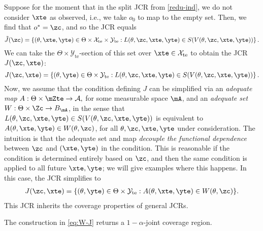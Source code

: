 \documentclass[english]{article}
\begin{document}
Suppose for the moment that in the split JCR from \eqref{redu-ind}, 
we do not consider $\xte$ as observed, i.e., 
we take $o_0$ to map to the empty set.
Then, we find that $o^* = \zc$, and so the JCR equals
$$\tilde J(\zc)= \left\{(\theta, \xte,\yte) 
\in\Theta\times\mathcal{X}_{\mathrm{te}} \times \mathcal{Y}_{\mathrm{te}}: 
L(\theta,\zc,\xte,\yte) \in S(V(\theta,\zc,\xte,\yte)) \right\}.$$
We can take the $\Theta \times \mathcal{Y}_{\mathrm{te}}$-section of this set
over $\xte \in\mathcal{X}_{\mathrm{te}}$ to obtain the JCR $J(\zc,\xte)$: 
$$J(\zc,\xte)
= \left\{(\theta,\yte) 
\in\Theta \times \mathcal{Y}_{\mathrm{te}}: 
L(\theta,\zc,\xte,\yte) \in S(V(\theta,\zc,\xte,\yte)) \right\}.$$
Now, we assume that the condition defining 
$J$ 
can be simplified via 
an \emph{adequate map} 
$A:
\Theta \times \mZte \to \mathcal{A},$ 
for some measurable space $\mA$,
and
an \emph{adequate set} $W:\Theta\times \Zc \to B_{\mA}$, 
in the sense that
$L(\theta,\zc,\xte,\yte) \in S(V(\theta,\zc,\xte,\yte))$ is equivalent to
$ A(\theta,\xte,\yte) \in W(\theta,\zc)
$, for all $\theta,\zc,\xte,\yte$ under consideration.
The intuition is that the adequate set and map \emph{decouple the
functional dependence} between $\zc$ and $(\xte,\yte)$ in the condition. 
This is reasonable if the condition is determined entirely 
based on $\zc$, and then the same condition is applied to all future $\xte,\yte$;  we will give examples where this happens.
In this case, the JCR simplifies to
\begin{align}\label{eq:W-J}
    J(\zc,\xte) = \{(\theta,\yte)\in\Theta \times \mathcal{Y}_{\mathrm{te}}:
    A(\theta,\xte,\yte) \in W(\theta,\zc)\}.
\end{align}
This JCR inherits the coverage properties of general JCRs.
\begin{theorem}\label{thm:adequate-set}
   The construction in \eqref{eq:W-J} returns a $1-\alpha$-joint coverage region.
\end{theorem}
\end{document}
